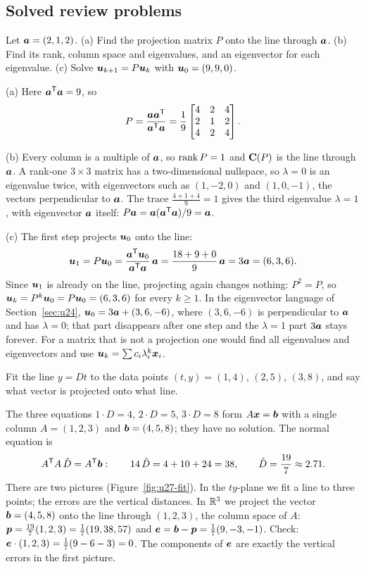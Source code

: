 \subsection{Solved review problems}

\begin{example}\label{ex:u27-projection}
Let $\boldsymbol{a}=(2,1,2)$. (a) Find the projection matrix $P$ onto the line through $\boldsymbol{a}$.
(b) Find its rank, column space and eigenvalues, and an eigenvector for each eigenvalue.
(c) Solve $\boldsymbol{u}_{k+1}=P\boldsymbol{u}_k$ with $\boldsymbol{u}_0=(9,9,0)$.

(a) Here $\boldsymbol{a}^{\mathsf{T}}\boldsymbol{a}=9$, so
\[
  P=\frac{\boldsymbol{a}\boldsymbol{a}^{\mathsf{T}}}{\boldsymbol{a}^{\mathsf{T}}\boldsymbol{a}}=\frac19\begin{bmatrix} 4&2&4\\ 2&1&2\\ 4&2&4\end{bmatrix}.
\]

(b) Every column is a multiple of $\boldsymbol{a}$, so $\operatorname{rank} P=1$ and $\mathbf{C}(P)$ is the line through
$\boldsymbol{a}$. A rank-one $3\times3$ matrix has a two-dimensional nullspace, so $\lambda=0$ is an
eigenvalue twice, with eigenvectors such as $(1,-2,0)$ and $(1,0,-1)$, the vectors
perpendicular to $\boldsymbol{a}$. The trace $\tfrac{4+1+4}{9}=1$ gives the third eigenvalue
$\lambda=1$, with eigenvector $\boldsymbol{a}$ itself: $P\boldsymbol{a}=\boldsymbol{a}(\boldsymbol{a}^{\mathsf{T}}\boldsymbol{a})/9=\boldsymbol{a}$.

(c) The first step projects $\boldsymbol{u}_0$ onto the line:
\[
  \boldsymbol{u}_1=P\boldsymbol{u}_0=\frac{\boldsymbol{a}^{\mathsf{T}}\boldsymbol{u}_0}{\boldsymbol{a}^{\mathsf{T}}\boldsymbol{a}}\,\boldsymbol{a}=\frac{18+9+0}{9}\,\boldsymbol{a}=3\boldsymbol{a}=(6,3,6).
\]
Since $\boldsymbol{u}_1$ is already on the line, projecting again changes nothing: $P^{2}=P$, so
$\boldsymbol{u}_k=P^{k}\boldsymbol{u}_0=P\boldsymbol{u}_0=(6,3,6)$ for every $k\ge1$. In the eigenvector language of
Section~\ref{sec:u24}, $\boldsymbol{u}_0=3\boldsymbol{a}+(3,6,-6)$, where $(3,6,-6)$ is perpendicular to
$\boldsymbol{a}$ and has $\lambda=0$; that part disappears after one step and the $\lambda=1$ part
$3\boldsymbol{a}$ stays forever. For a matrix that is not a projection one would find all eigenvalues
and eigenvectors and use $\boldsymbol{u}_k=\sum c_i\lambda_i^{k}\boldsymbol{x}_i$.
\end{example}

\begin{example}\label{ex:u27-leastsq}
Fit the line $y=Dt$ to the data points $(t,y)=(1,4)$, $(2,5)$, $(3,8)$, and say what vector
is projected onto what line.

The three equations $1\cdot D=4$, $2\cdot D=5$, $3\cdot D=8$ form $A\boldsymbol{x}=\boldsymbol{b}$ with a
single column $A=(1,2,3)$ and $\boldsymbol{b}=(4,5,8)$; they have no solution. The normal equation is
\[
  A^{\mathsf{T}} A\,\hat D=A^{\mathsf{T}}\boldsymbol{b}:\qquad 14\,\hat D=4+10+24=38,\qquad \hat D=\frac{19}{7}\approx2.71 .
\]
There are two pictures (Figure~\ref{fig:u27-fit}). In the $ty$-plane we fit a line to three
points; the errors are the vertical distances. In $\mathbb{R}^{3}$ we project the vector
$\boldsymbol{b}=(4,5,8)$ onto the line through $(1,2,3)$, the column space of $A$:
$\boldsymbol{p}=\tfrac{19}{7}(1,2,3)=\tfrac17(19,38,57)$ and
$\boldsymbol{e}=\boldsymbol{b}-\boldsymbol{p}=\tfrac17(9,-3,-1)$. Check: $\boldsymbol{e}\cdot(1,2,3)=\tfrac17(9-6-3)=0$.
The components of $\boldsymbol{e}$ are exactly the vertical errors in the first picture.
\end{example}

